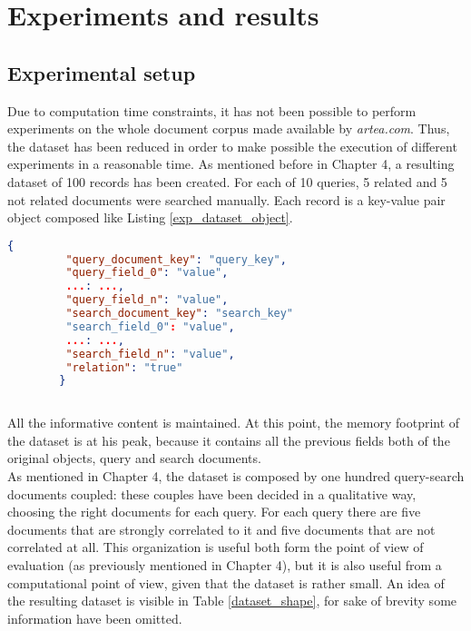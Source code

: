 \documentclass[\main/main.tex]{subfiles}
\begin{document}
\chapter{Experiments and results}
\section{Experimental setup}
Due to computation time constraints, it has not been possible to perform experiments on the whole document corpus made available by \emph{artea.com}. Thus, the dataset has been reduced in order to make possible the execution of different experiments in a reasonable time. As mentioned before in Chapter 4, a resulting dataset of 100 records has been created. For each of 10 queries, 5 related and 5 not related documents were searched manually. Each record is a key-value pair object composed like Listing \ref{exp_dataset_object}.
\begin{center}
    \begin{lstlisting}[language=json, caption="Experimental dataset object", captionpos=b, label={exp_dataset_object}]
        {
         "query_document_key": "query_key",
         "query_field_0": "value",
         ...: ...,
         "query_field_n": "value",
         "search_document_key": "search_key"
         "search_field_0": "value",
         ...: ...,
         "search_field_n": "value",
         "relation": "true"
        }
    
    \end{lstlisting}
\end{center}
All the informative content is maintained. At this point, the memory footprint of the dataset is at his peak, because it contains all the previous fields both of the original objects, query and search documents.\\
As mentioned in Chapter 4, the dataset is composed by one hundred query-search documents coupled: these couples have been decided in a qualitative way, choosing the right documents for each query. For each query there are five documents that are strongly correlated to it and five documents that are not correlated at all. This organization is useful both form the point of view of evaluation (as previously mentioned in Chapter 4), but it is also useful from a computational point of view, given that the dataset is rather small.
An idea of the resulting dataset is visible in Table \ref{dataset_shape}, for sake of brevity some information have been omitted.
\end{document}
